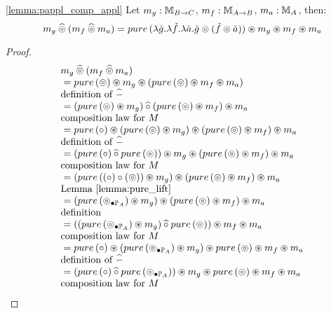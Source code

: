 \begin{lemmaa}{\ref{lemma:pappl_comp_appl}}
Let $m_g:\mstream{B\rightarrow C}$, $m_f:\mstream{A\rightarrow B}$, $m_a:\mstream{A}$, then:
$$
m_g \alift{\pappl} (m_f \alift{\pappl} m_a)
 = \apure\, (\lambda \pstr{g}. \lambda \pstr{f}. \lambda \pstr{a}. \pstr{g} \pappl (\pstr{f}\pappl \pstr{a})) \appl m_g \appl m_f \appl m_a
$$
\end{lemmaa}
\begin{proof}
$$
\begin{array}{ll}
m_g \alift{\pappl} (m_f \alift{\pappl} m_a) \\
{}= \apure\, (\pappl) \appl m_g \appl (\apure\, (\pappl) \appl m_f \appl m_a) \\
 \mbox{definition of }\alift{-}\\
{}= (\apure\, (\pappl) \appl m_g) \alift{\comp} (\apure\, (\pappl) \appl m_f)  \appl m_a \\
 \mbox{composition law for }M \\
{}=   \apure\, (\comp) \appl  (\apure\, (\pappl) \appl m_g) \appl (\apure\, (\pappl) \appl m_f) \appl m_a \\
 \mbox{definition of }\alift{-}\\
{}=   (\apure\, (\comp) \alift{\comp}  \apure\, (\pappl)) \appl m_g \appl (\apure\, (\pappl) \appl m_f) \appl m_a \\
 \mbox{composition law for }M \\
{}=   ( \apure\, ((\comp) \comp (\pappl)) \appl m_g ) \appl (\apure\, (\pappl) \appl m_f)   \appl m_a\\
 \mbox{Lemma \ref{lemma:pure_lift}}\\
{}=   ( \apure\, (\clift{\pappl}{\pstream{A}}) \appl m_g ) \appl (\apure\, (\pappl) \appl m_f)   \appl m_a\\
 \mbox{definition}\\
{}=   ( ( \apure\, (\clift{\pappl}{\pstream{A}})  \appl m_g ) \alift{\comp} \apure\, (\pappl)) \appl m_f  \appl m_a\\
 \mbox{composition law for }M \\
{}=  \apure\, (\comp) \appl (\apure\, (\clift{\pappl}{\pstream{A}})  \appl m_g ) \appl \apure\, (\pappl)  \appl m_f  \appl m_a\\
 \mbox{definition of }\alift{-} \\
{}=   (\apure\, (\comp) \alift{\comp}  \apure\, (\clift{\pappl}{\pstream{A}}) ) \appl m_g \appl \apure\, (\pappl) \appl m_f \appl m_a\\
 \mbox{composition law for }M \\

\end{array}$$
\end{proof}

